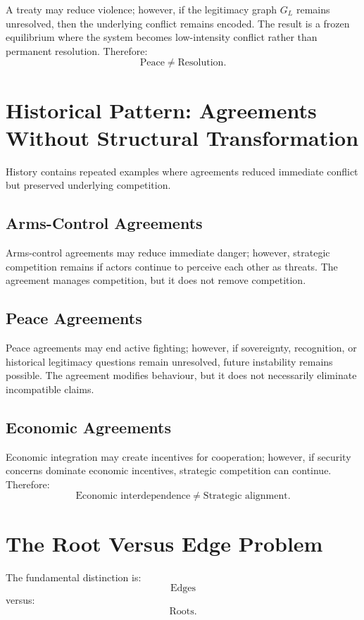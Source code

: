 \documentclass[11pt,openany]{book}
\theoremstyle{plain}
\theoremstyle{definition}
\begin{document}
A treaty may reduce violence; however, if the legitimacy graph \(G_L\) remains unresolved, then the underlying conflict remains encoded. The result is a frozen equilibrium where the system becomes low-intensity conflict rather than permanent resolution. Therefore:
\[
\text{Peace}
\neq
\text{Resolution}.
\]

\section*{Historical Pattern: Agreements Without Structural Transformation}

History contains repeated examples where agreements reduced immediate conflict but preserved underlying competition.

\subsection*{Arms-Control Agreements}

Arms-control agreements may reduce immediate danger; however, strategic competition remains if actors continue to perceive each other as threats. The agreement manages competition, but it does not remove competition.

\subsection*{Peace Agreements}

Peace agreements may end active fighting; however, if sovereignty, recognition, or historical legitimacy questions remain unresolved, future instability remains possible. The agreement modifies behaviour, but it does not necessarily eliminate incompatible claims.

\subsection*{Economic Agreements}

Economic integration may create incentives for cooperation; however, if security concerns dominate economic incentives, strategic competition can continue. Therefore:
\[
\text{Economic interdependence}
\neq
\text{Strategic alignment}.
\]

\section*{The Root Versus Edge Problem}

The fundamental distinction is:
\[
\boxed{
\text{Edges}
}
\]
versus:
\[
\boxed{
\text{Roots.}
}
\]
\end{document}
